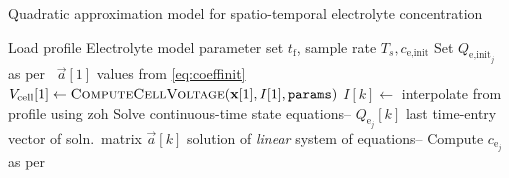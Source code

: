 
\begin{algorithm}[!htbp]
    \caption{Quadratic approximation model for spatio-temporal electrolyte concentration}\label{alg:quadraticce}
    \begin{algorithmic}[1]
        \Require Load profile 
        \Require Electrolyte model parameter set  
        \Userdata $ t_\text{f}$,  sample rate $T_s, c_\text{e,init}$
        \State Set $Q_{\text{e,init}_j}$ as per~
        \State $\vec{a}[1]$ \gets values from \cref{eq:coeffinit}
        \State $V_\text{cell}[1] \gets \textsc{ComputeCellVoltage}(\textbf{x}[1],I[1],\texttt{params})$ 
        \State $I[k] \gets $ interpolate from profile using \gls{zoh}
        \State Solve continuous-time state equations-- 
        \State $Q_{\text{e}_j}[k]$ \gets last time-entry  vector of soln.\  matrix 
        \State $\vec{a}[k]$ \gets solution of \emph{linear} system of equations-- 
        \State Compute $c_{\text{e}_j}$ as per~ 
        \EndFor
        \EndFunction
    \end{algorithmic}
\end{algorithm}
